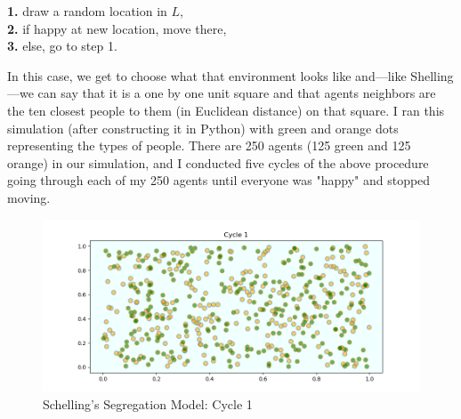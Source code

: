 \documentclass[12pt,twoside]{reedthesis}
\begin{document}
\begin{adjustwidth}{1cm}{}
	\textbf{1.} draw a random location in $L$, \\
	\textbf{2.} if happy at new location, move there,\\
	\textbf{3.} else, go to step 1.
\end{adjustwidth}

In this case, we get to choose what that environment looks like and---like Shelling---we can say that it is a one by one unit square and that agents neighbors are the ten closest people to them (in Euclidean distance) on that square. I ran this simulation (after constructing it in Python) with green and orange dots representing the types of people. There are 250 agents (125 green and 125 orange) in our simulation, and I conducted five cycles of the above procedure going through each of my 250 agents until everyone was "happy" and stopped moving.

\begin{figure}[h!]
	\centering
	\includegraphics[scale=0.5]{Figures/segregation_1}
	\caption{Schelling's Segregation Model: Cycle 1}
	\label{SSM1_ch1}
\end{figure}
\end{document}
